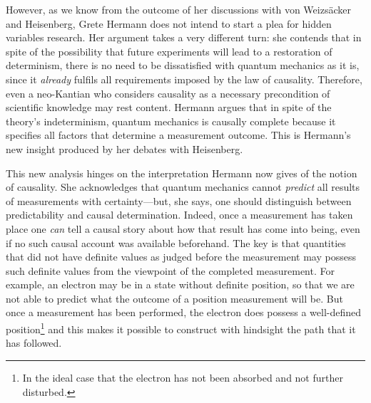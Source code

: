 \documentclass[12pt]{article}
\begin{document}
However, as we know from the outcome of her discussions with von Weizs\"{a}cker and Heisenberg, Grete Hermann does not intend to start a plea for hidden variables research. Her argument takes a very different turn: she contends that in spite of the possibility that future experiments will lead to a restoration of determinism, there is no need to be dissatisfied with quantum mechanics as it is, since it \emph{already} fulfils all requirements imposed by the law of causality. Therefore, even a neo-Kantian who considers causality as a necessary precondition of scientific knowledge may rest content. Hermann argues that in spite of the theory's indeterminism, quantum mechanics is causally complete because it specifies all factors that determine a measurement outcome. This is Hermann's new insight produced by her debates with Heisenberg.

This new analysis hinges on the interpretation Hermann now gives of the notion of causality. She acknowledges that quantum mechanics cannot \emph{predict} all results of measurements with certainty---but, she says, one should distinguish between predictability and causal determination. Indeed, once a measurement has taken place one \emph{can} tell a causal story about how that result has come into being, even if no such causal account was available beforehand. The key is that quantities that did not have definite values as judged before the measurement may possess such definite values from the viewpoint of the completed measurement. For example, an electron may be in a state without definite position, so that we are not able to predict what the outcome of a position measurement will be. But once a measurement has been performed, the electron does possess a well-defined position\footnote{In the ideal case that the electron has not been absorbed and not further disturbed.} and this makes it possible to construct with hindsight the path that it has followed.
\end{document}
